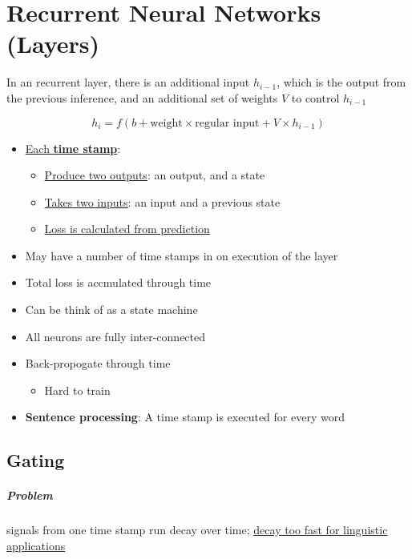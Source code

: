 \chapter{Recurrent Neural Networks (Layers)}

In an recurrent layer, there is an additional input $ h_{i - 1} $, which is
the output from the previous inference, and an additional set of weights
$ V $ to control $ h_{i - 1} $

\begin{equation}
  h_{i} = f
  \left(
    b + \text{weight} \times \text{regular input} + V \times h_{i - 1}
  \right)
\end{equation}

\begin{itemize}
  \item \ul{Each \textbf{time stamp}}:
  \begin{itemize}
    \item \ul{Produce two outputs}: an output, and a state
    \item \ul{Takes two inputs}: an input and a previous state
    \item \ul{Loss is calculated from prediction}
  \end{itemize}

  \item May have a number of time stamps in on execution of the layer
  \item Total loss is accmulated through time
  \item Can be think of as a state machine
  \item All neurons are fully inter-connected
  \item Back-propogate through time
  \begin{itemize}
    \item Hard to train
  \end{itemize}

  \item \textbf{Sentence processing}: A time stamp is executed
  for every word
\end{itemize}

\section{Gating}

  \paragraph{Problem} signals from one time stamp run decay over time;
  \ul{decay too fast for linguistic applications}

